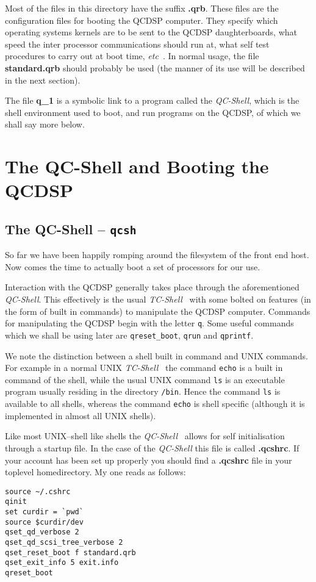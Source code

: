 Most of the files in this directory have the suffix {\bf .qrb}. 
These files are the configuration files for booting the QCDSP computer.
They specify which operating systems kernels are to be sent to the
QCDSP daughterboards, what speed the inter processor communications 
should run at, what self test procedures to carry out at boot time, {\em etc}\ .
In normal usage, the file {\bf standard.qrb} should probably be used
(the manner of its use will be described in the next section).

The file {\bf q\_1} is a symbolic link to a program called the 
{\em QC-Shell}, which is the shell environment used to boot, and 
run programs on the QCDSP, of which we shall say more below.

\section{The QC-Shell and Booting the QCDSP}
\subsection{The QC-Shell -- {\tt qcsh}}
So far we have been happily romping around the filesystem of the 
front end host. Now comes the time to actually boot a set of processors
for our use.

Interaction with the QCDSP generally takes place through the aforementioned
{\em QC-Shell}. This effectively is the usual {\em TC-Shell} \ with some 
bolted on features (in the form of built in commands) to manipulate the 
QCDSP computer. Commands for manipulating the QCDSP begin with the letter
{\tt q}. Some useful commands which we shall be using later are 
{\tt qreset\_boot}, {\tt qrun} and {\tt qprintf}. 

We note the distinction between a shell built in command and UNIX
commands. For example in a normal UNIX {\em TC-Shell} \ the command
{\tt echo} is a built in command of the shell, while the usual
UNIX command {\tt ls} is an executable program usually residing in
the directory {\tt /bin}.  Hence the command {\tt ls} is available to
all shells, whereas the command {\tt echo} is shell specific (although
it is implemented in almost all UNIX shells). 

Like most UNIX--shell like shells the {\em QC-Shell} \ allows for
self initialisation through a startup file. In the case of the {\em
QC-Shell} this file is called {\bf .qcshrc}. If your account has been
set up properly you should find a {\bf .qcshrc} file in your toplevel
homedirectory. My one reads as follows:
\begin{verbatim}
source ~/.cshrc
qinit
set curdir = `pwd`
source $curdir/dev
qset_qd_verbose 2
qset_qd_scsi_tree_verbose 2
qset_reset_boot f standard.qrb
qset_exit_info 5 exit.info
qreset_boot
\end{verbatim}

